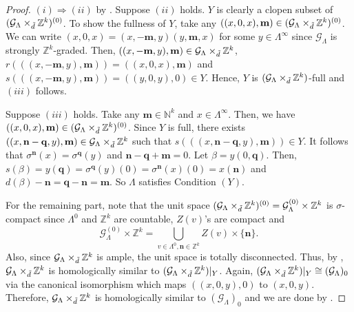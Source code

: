 \documentclass[12pt]{amsart}
\newcommand{\N}{\mathbf{n}}
\newcommand{\M}{\mathbf{m}}
\theoremstyle{definition}
\theoremstyle{remark}
\begin{document}
\begin{proof}
$(i)\Longrightarrow (ii)$ by \cite[Theorem 4.12]{CHR}. Suppose $(ii)$ holds. $Y$ is clearly a clopen subset of $(\mathcal{G}_\Lambda\times_{\Tilde{d}} \mathbb{Z}^k)^{(0)}$. To show the fullness of $Y$, take any $((x,0,x),\M)\in (\mathcal{G}_\Lambda\times_{\Tilde{d}} \mathbb{Z}^k)^{(0)}$. We can write $(x,0,x)=(x,-\M,y)(y,\M,x)$ for some $y\in \Lambda^\infty$ since $\mathcal{G}_\Lambda$ is strongly $\mathbb{Z}^k$-graded. Then, $((x,-\M,y),\M)\in \mathcal{G}_\Lambda\times_{\Tilde{d}}\mathbb{Z}^k$, $r(((x,-\M,y),\M))=((x,0,x),\M)$ and $s(((x,-\M,y),\M))=((y,0,y),0)\in Y$. Hence, $Y$ is $(\mathcal{G}_\Lambda\times_{\Tilde{d}} \mathbb{Z}^k)$-full and $(iii)$ follows.

Suppose $(iii)$ holds. Take any $\M\in \mathbb{N}^k$ and $x\in \Lambda^\infty$. Then, we have $((x,0,x),\M)\in (\mathcal{G}_\Lambda\times_{\Tilde{d}} \mathbb{Z}^k)^{(0)}$. Since $Y$ is full, there exists $((x,\N-\mathbf{q},y),\M)\in \mathcal{G}_\Lambda\times_{\Tilde{d}}\mathbb{Z}^k$ such that $s(((x,\N-\mathbf{q},y),\M))\in Y$. It follows that $\sigma^\N(x)=\sigma^\mathbf{q}(y)$ and $\N-\mathbf{q}+\M=0$. Let $\beta=y(0,\mathbf{q})$. Then, $s(\beta)=y(\mathbf{q})=\sigma^\mathbf{q}(y)(0)=\sigma^\N(x)(0)=x(\N)$ and $d(\beta)-\N=\mathbf{q}-\N=\M$. So $\Lambda$ satisfies Condition $(Y)$. 

For the remaining part, note that the unit space $(\mathcal{G}_\Lambda\times_{\Tilde{d}} \mathbb{Z}^k)^{(0)}=\mathcal{G}_\Lambda^{(0)}\times \mathbb{Z}^k$ is $\sigma$-compact since $\Lambda^0$ and $\mathbb{Z}^k$ are countable, $Z(v)$'s are compact and \[\mathcal{G}_\Lambda^{(0)}\times \mathbb{Z}^k=\displaystyle{\bigcup_{v\in \Lambda^0,\N\in \mathbb{Z}^k}} Z(v)\times \{\N\}.\] Also, since $\mathcal{G}_\Lambda\times_{\Tilde{d}} \mathbb{Z}^k$ is ample, the unit space is totally disconnected. Thus, by \cite[Theorem 3.6 (2)]{Matui}, $\mathcal{G}_\Lambda\times_{\Tilde{d}} \mathbb{Z}^k$ is homologically similar to $(\mathcal{G}_\Lambda\times_{\Tilde{d}} \mathbb{Z}^k)|_{Y}$. Again, $(\mathcal{G}_\Lambda\times_{\Tilde{d}} \mathbb{Z}^k)|_{Y}\cong (\mathcal{G}_\Lambda)_0$ via the canonical isomorphism which maps $((x,0,y),0)$ to $(x,0,y)$. Therefore, $\mathcal{G}_\Lambda\times_{\Tilde{d}} \mathbb{Z}^k$ is homologically similar to $(\mathcal{G}_\Lambda)_0$ and we are done by \cite[Theorem 3.5 (2)]{Matui}. 
\end{proof}
\end{document}
